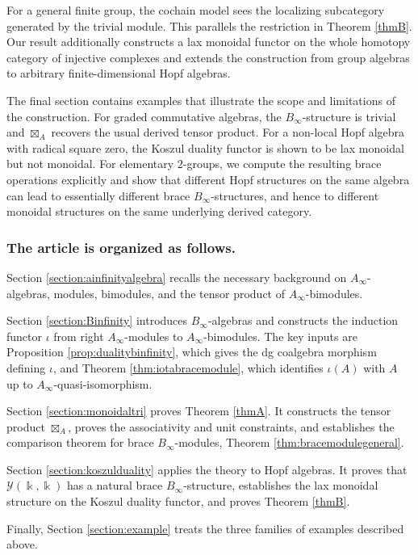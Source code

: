 \documentclass[a4paper, 11pt]{amsart}
\theoremstyle{definition}
\theoremstyle{remark}
\numberwithin{equation}{section}
\newcommand{\Y}{\mathcal{Y}}
\begin{document}
For a general finite group, the cochain model sees the localizing
subcategory generated by the trivial module. This parallels the
restriction in Theorem \ref{thmB}. Our result additionally constructs
a lax monoidal functor on the whole homotopy category of injective
complexes and extends the construction from group algebras to
arbitrary finite-dimensional Hopf algebras.


The final section contains examples that illustrate the scope and limitations of the construction. For graded commutative algebras, the $B_\infty$-structure is trivial and $\boxtimes_A$ recovers the usual derived tensor product. For a non-local Hopf algebra with radical square zero, the Koszul duality functor is shown to be lax monoidal but not monoidal. For elementary $2$-groups, we compute the resulting brace operations explicitly and show that different Hopf structures on the same algebra can lead to essentially different brace $B_\infty$-structures, and hence to different monoidal structures on the same underlying derived category.

\subsubsection*{The article is organized as follows.}
Section \ref{section:ainfinityalgebra} recalls the necessary background on $A_\infty$-algebras, modules, bimodules, and the tensor product of $A_\infty$-bimodules.

Section \ref{section:Binfinity} introduces $B_\infty$-algebras and constructs the induction functor $\iota$ from right $A_\infty$-modules to $A_\infty$-bimodules. The key inputs are Proposition \ref{prop:dualitybinfinity}, which gives the dg coalgebra morphism defining $\iota$, and Theorem \ref{thm:iotabracemodule}, which identifies $\iota(A)$ with $A$ up to $A_\infty$-quasi-isomorphism.

Section \ref{section:monoidaltri} proves Theorem \ref{thmA}. It constructs the tensor product $\boxtimes_A$, proves the associativity and unit constraints, and establishes the comparison theorem for brace $B_\infty$-modules, Theorem \ref{thm:bracemodulegeneral}.

Section \ref{section:koszulduality} applies the theory to Hopf algebras. It proves that $\Y(\Bbbk,\Bbbk)$ has a natural brace $B_\infty$-structure, establishes the lax monoidal structure on the Koszul duality functor, and proves Theorem \ref{thmB}.

Finally, Section \ref{section:example} treats the three families of examples described above.
\end{document}
